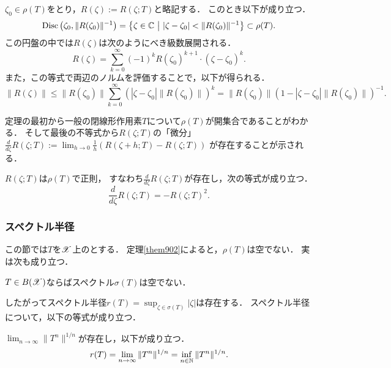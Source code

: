     \begin{Them}[定理9.5, p.211]
        $\zeta_0 \in \rho(T)$をとり，$R(\zeta):=R(\zeta;T)$と略記する．
        このとき以下が成り立つ．
        \[
            \mathrm{Disc} \left(\zeta_0, \|R(\zeta_0)\|^{-1} \right)
            =\left\{ \zeta \in \mathbb{C} ~\middle|~ |\zeta-\zeta_0|<\|R(\zeta_0)\|^{-1} \right\}
            \subset \rho(T).
        \]
        この円盤の中では$R(\zeta)$は次のようにべき級数展開される．
        \[ R(\zeta)=\sum_{k=0}^{\infty} (-1)^kR(\zeta_0)^{k+1} \cdot (\zeta-\zeta_0)^k. \]
        また，この等式で両辺のノルムを評価することで，以下が得られる．
        \[
            \|R(\zeta)\|
            \leq \|R(\zeta_0)\| \sum_{k=0}^{\infty}\left( |\zeta-\zeta_0|\|R(\zeta_0)\| \right)^k
            =\|R(\zeta_0)\| (1-|\zeta-\zeta_0|\|R(\zeta_0)\|)^{-1}.
        \]
    \end{Them}
    定理の最初から一般の閉線形作用素$T$について$\rho(T)$が開集合であることがわかる．
    そして最後の不等式から$R(\zeta;T)$の「微分」$\frac{d}{d \zeta}R(\zeta;T):=\lim_{h \to 0}\frac{1}{h} (R(\zeta+h;T)-R(\zeta;T))$
    が存在することが示される．

    \begin{Them}[定理9.6, p.212]
        $R(\zeta;T)$は$\rho(T)$で正則，
        すなわち$\frac{d}{d \zeta}R(\zeta;T)$が存在し，次の等式が成り立つ．
        \[ \frac{d}{d \zeta}R(\zeta;T)=-R(\zeta;T)^2. \]
    \end{Them}

    \subsubsection{スペクトル半径}
    この節では$T$を$\mathscr{X}$上のとする．
    定理\ref{them902}によると，$\rho(T)$は空でない．
    実は次も成り立つ．
    \begin{Them}[定理9.8, p.213]
        $T \in B(\mathscr{X})$ならばスペクトル$\sigma(T)$は空でない．
    \end{Them}
    したがってスペクトル半径$r(T)=\sup_{\zeta \in \sigma(T)}|\zeta|$は存在する．
    スペクトル半径について，以下の等式が成り立つ．
    \begin{Them}[定理9.12, p.215] \label{them912}
        $\lim_{n \to \infty} \|T^n\|^{1/n}$が存在し，以下が成り立つ．
        \[ r(T)=\lim_{n \to \infty} \|T^n\|^{1/n}=\inf_{n \in \mathbb{N}} \|T^n\|^{1/n}. \]
    \end{Them}

